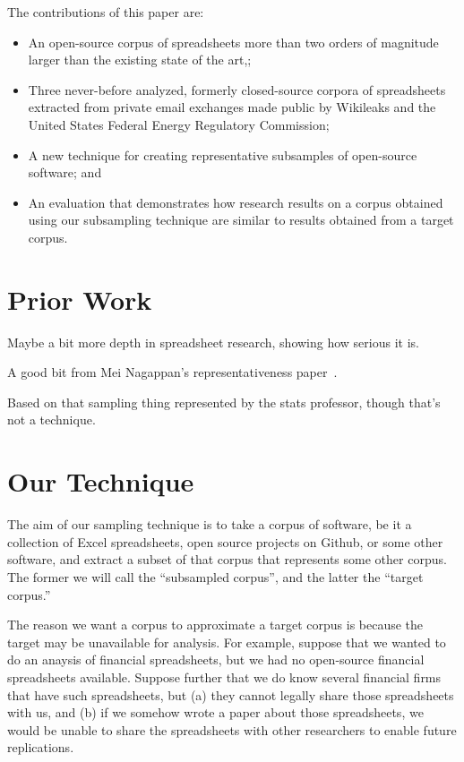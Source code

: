 \documentclass[conference]{IEEEtran}
\begin{document}
The contributions of this paper are:

\begin{itemize}
  \item An open-source corpus of spreadsheets more than two orders of magnitude larger
 		than the existing state of the art,;
  \item Three never-before analyzed, formerly closed-source corpora of spreadsheets extracted
  		from private email exchanges made public by Wikileaks and the United States Federal 
  		Energy Regulatory Commission;
  \item A new technique for creating representative subsamples of open-source
  		software; and
  \item An evaluation that demonstrates 
		how research results on a corpus obtained using our subsampling technique
		are similar to results obtained from a target corpus.
\end{itemize}

\section{Prior Work}

Maybe a bit more depth in spreadsheet research, showing how serious it is.

A good bit from Mei Nagappan's representativeness paper~\cite{nagappan2013diversity}.

Based on that sampling thing represented by the stats professor,
though that's not a technique.

\section{Our Technique}

The aim of our sampling technique is to take a corpus of software, be it 
a collection of Excel spreadsheets, open source projects on Github, 
or some other software, and extract a subset of that corpus that represents
some other corpus.
The former we will call the ``subsampled corpus'', and the latter the
``target corpus.''

The reason we want a corpus to approximate a target corpus is because the 
target may be unavailable for analysis.
For example, suppose that we wanted to do an anaysis of financial spreadsheets,
but we had no open-source financial spreadsheets available.
Suppose further that we do know several financial firms that have such spreadsheets,
but (a) they cannot legally share those spreadsheets with us, and (b) if we somehow wrote a paper
about those spreadsheets, we would be unable to share the spreadsheets with other researchers
to enable future replications.
\end{document}
